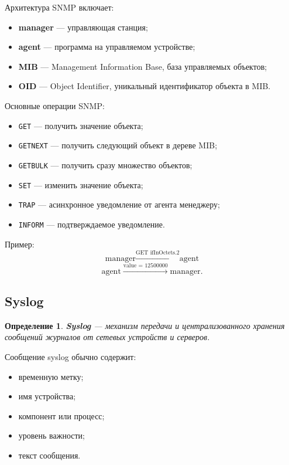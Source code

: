 \documentclass[12pt,a4paper]{article}
\newtheorem{definition}{Определение}
\begin{document}
Архитектура SNMP включает:
\begin{itemize}
    \item \textbf{manager} --- управляющая станция;
    \item \textbf{agent} --- программа на управляемом устройстве;
    \item \textbf{MIB} --- Management Information Base, база управляемых объектов;
    \item \textbf{OID} --- Object Identifier, уникальный идентификатор объекта в MIB.
\end{itemize}

Основные операции SNMP:
\begin{itemize}
    \item \texttt{GET} --- получить значение объекта;
    \item \texttt{GETNEXT} --- получить следующий объект в дереве MIB;
    \item \texttt{GETBULK} --- получить сразу множество объектов;
    \item \texttt{SET} --- изменить значение объекта;
    \item \texttt{TRAP} --- асинхронное уведомление от агента менеджеру;
    \item \texttt{INFORM} --- подтверждаемое уведомление.
\end{itemize}

Пример:
\[
\text{manager} \xrightarrow{\text{GET ifInOctets.2}} \text{agent}
\]
\[
\text{agent} \xrightarrow{\text{value = 12500000}} \text{manager}.
\]

\subsection{Syslog}

\begin{definition}
\textbf{Syslog} --- механизм передачи и централизованного хранения сообщений журналов от сетевых устройств и серверов.
\end{definition}

Сообщение syslog обычно содержит:
\begin{itemize}
    \item временную метку;
    \item имя устройства;
    \item компонент или процесс;
    \item уровень важности;
    \item текст сообщения.
\end{itemize}
\end{document}
